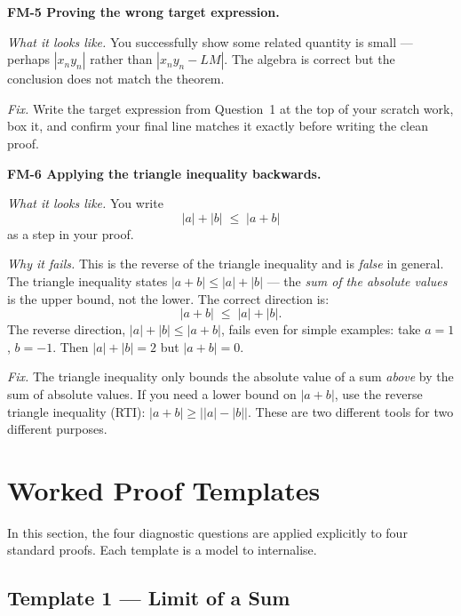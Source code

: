 \bigskip

\noindent\textbf{FM-5 \quad Proving the wrong target expression.}

\textit{What it looks like.}
You successfully show some related quantity is small ---
perhaps $|x_n y_n|$ rather than $|x_n y_n - LM|$.
The algebra is correct but the conclusion does not match the theorem.

\textit{Fix.} Write the target expression from Question~1 at the top
of your scratch work, box it, and confirm your final line matches it
exactly before writing the clean proof.

\bigskip

\noindent\textbf{FM-6 \quad Applying the triangle inequality backwards.}

\textit{What it looks like.}
You write
\[
  |a| + |b| \;\le\; |a + b|
\]
as a step in your proof.

\textit{Why it fails.}
This is the reverse of the triangle inequality and is \emph{false} in
general.
The triangle inequality states $|a + b| \le |a| + |b|$ — the
\emph{sum of the absolute values} is the upper bound, not the lower.
The correct direction is:
\[
  |a + b| \;\le\; |a| + |b|.
\]
The reverse direction, $|a| + |b| \le |a + b|$, fails even for simple
examples: take $a = 1$, $b = -1$.
Then $|a| + |b| = 2$ but $|a + b| = 0$.

\textit{Fix.} The triangle inequality only bounds the absolute value of
a sum \emph{above} by the sum of absolute values.
If you need a lower bound on $|a + b|$, use the reverse triangle
inequality (RTI): $|a + b| \ge \bigl||a| - |b|\bigr|$.
These are two different tools for two different purposes.

\clearpage


\section{Worked Proof Templates}
\label{sec:proof-templates}

In this section, the four diagnostic questions are applied explicitly
to four standard proofs. Each template is a model to internalise.

\subsection{Template 1 — Limit of a Sum}

